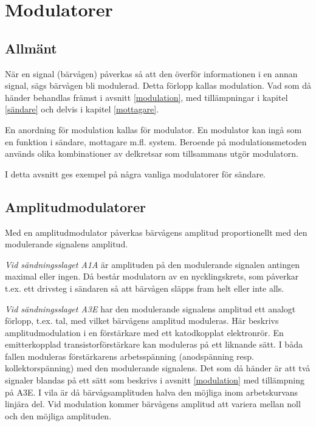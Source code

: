 \section{Modulatorer}

\subsection{Allmänt}

När en signal (bärvågen) påverkas så att den överför informationen i
en annan signal, sägs bärvågen bli modulerad. Detta förlopp kallas
modulation. Vad som då händer behandlas främst i avsnitt
\ref{modulation}, med tillämpningar i kapitel \ref{sändare} och delvis i
kapitel \ref{mottagare}.

En anordning för modulation kallas för modulator. En modulator kan
ingå som en funktion i sändare, mottagare m.fl. system.  Beroende på
modulationsmetoden används olika kombinationer av delkretsar som
tillsammans utgör modulatorn.

I detta avsnitt ges exempel på några vanliga modulatorer för sändare.

\subsection{Amplitudmodulatorer}

Med en amplitudmodulator påverkas bärvågens amplitud proportionellt
med den modulerande signalens amplitud.

\emph{Vid sändningsslaget A1A} är amplituden på den modulerande
signalen antingen maximal eller ingen. Då består modulatorn av en
nycklingskrets, som påverkar t.ex. ett drivsteg i sändaren så att
bärvågen släpps fram helt eller inte alls.

\emph{Vid sändningsslaget A3E} har den modulerande signalens amplitud
ett analogt förlopp, t.ex. tal, med vilket bärvågens amplitud
moduleras. Här beskrivs amplitudmodulation i en förstärkare med ett
katodkopplat elektronrör. En emitterkopplad transistorförstärkare kan
moduleras på ett liknande sätt. I båda fallen moduleras förstärkarens
arbetsspänning (anodspänning resp. kollektorspänning) med den
modulerande signalens. Det som då händer är att två signaler blandas
på ett sätt som beskrivs i avsnitt \ref{modulation} med tillämpning på A3E.
I vila är då bärvågsamplituden halva den möjliga inom arbetskurvans linjära
del. Vid modulation kommer bärvågens amplitud att variera mellan noll
och den möjliga amplituden.

